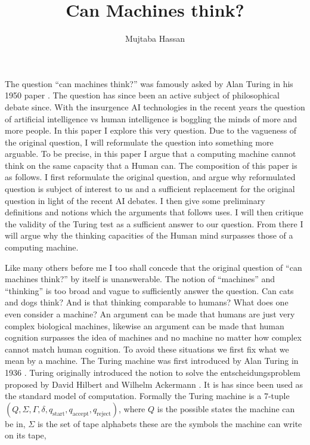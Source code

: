 \documentclass[11pt,a4paper]{article}
\title{Can Machines think?}
\author{Mujtaba Hassan}
\begin{document}
\maketitle

The question ``can machines think?'' was famously asked by Alan Turing in his 1950 paper \cite{Turing50}. The question has since been an active subject of philosophical debate since.
With the insurgence AI technologies in the recent years the question of artificial intelligence vs human intelligence is boggling the minds of more and more people. 
In this paper I explore this very question. Due to the vagueness of the original question, I will reformulate the question into something more arguable. To be precise, 
in this paper I argue that a computing machine cannot think on the same capacity that a Human can. The composition of this paper is as follows.
I first reformulate the original question, and argue why reformulated question is subject of interest to us and a sufficient replacement for the original question in light of the recent AI debates.
I then give some preliminary definitions and notions which the arguments that follows uses. I will then critique the validity of the Turing test as a sufficient answer to our question.
From there I will argue why the thinking capacities of the Human mind surpasses those of a computing machine.
\\\par\vspace*{0.5cm}
Like many others before me I too shall concede that the original question of ``can machines think?'' by itself is unanswerable.
The notion of ``machines'' and ``thinking'' is too broad and vague to sufficiently answer the question. Can cats and dogs think? And is that thinking comparable to humans?
What does one even consider a machine? An argument can be made that humans are just very complex biological machines, likewise an argument can be made that human cognition surpasses the idea of machines and no machine no matter how complex cannot match human cognition.
To avoid these situations we first fix what we mean by a machine. The Turing machine was first introduced by Alan Turing in 1936 \cite{Turing36}. 
Turing originally introduced the notion to solve the entscheidungsproblem proposed by David Hilbert and Wilhelm Ackermann \cite{hilbert}. It is has since been used as the standard model of computation.
Formally the Turing machine is a 7-tuple $(Q,\Sigma, \Gamma, \delta, q_{\text{start}}, q_{\text{accept}}, q_{\text{reject}})$, where $Q$ is the possible states the machine can be in, $\Sigma$ is the set of tape alphabets these are the symbols the machine can write on its tape, 
\end{document}
